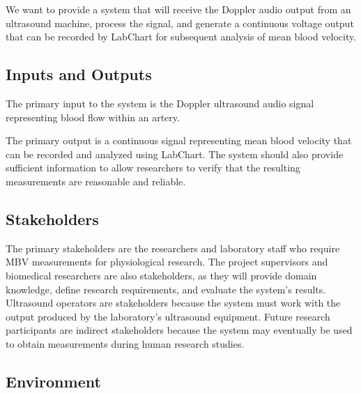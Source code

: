 \documentclass{article}
\begin{document}

We want to provide a system that will receive the Doppler audio output from an ultrasound machine, process the signal, and generate a continuous voltage output that can be recorded by LabChart for subsequent analysis of mean blood velocity.

\subsection{Inputs and Outputs}

The primary input to the system is the Doppler ultrasound audio signal representing blood flow within an artery.
 
The primary output is a continuous signal representing mean blood velocity that can be recorded and analyzed using LabChart. The system should also provide sufficient information to allow researchers to verify that the resulting measurements are reasonable and reliable.

\subsection{Stakeholders}

The primary stakeholders are the researchers and laboratory staff who require MBV measurements for physiological research. The project supervisors and biomedical researchers are also stakeholders, as they will provide domain knowledge, define research requirements, and evaluate the system's results. Ultrasound operators are stakeholders because the system must work with the output produced by the laboratory's ultrasound equipment. Future research participants are indirect stakeholders because the system may eventually be used to obtain measurements during human research studies.


\subsection{Environment}

\end{document}

